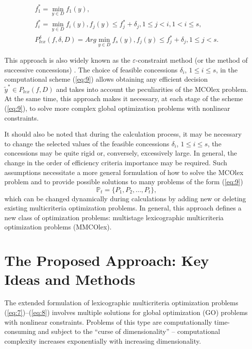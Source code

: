 \documentclass[smallextended]{svjour3}       %
\begin{document}
\begin{equation}\label{eq:9}
\begin{matrix}
f^*_1 =\min_{y \in D}{f_1(y)},  \\
f^*_i =\min_{y \in D}{f_i(y)},  f_j(y) \leq f^*_j + \delta_j, 1 \leq j < i, 1 < i \leq s, \\
P_{lex}^\delta(f,\delta,D) = Arg \min_{y \in D}{f_s(y)},f_j(y) \leq f^*_j + \delta_j, 1 \leq j < s.
\end{matrix}
\end{equation}

This approach is also widely known as the $\varepsilon$-constraint method (or the method of successive concessions) \cite{c39,c40,c41,c42}. The choice of feasible concessions $\delta_i$, $1 \leq i \leq s$, in the computational scheme (\ref{eq:9}) allows obtaining any efficient decision $\widetilde{y}^* \in P_{lex}(f,D)$ and takes into account the peculiarities of the MCOlex problem. At the same time, this approach makes it necessary, at each stage of the scheme (\ref{eq:9}), to solve more complex global optimization problems with nonlinear constraints.

It should also be noted that during the calculation process, it may be necessary to change the selected values of the feasible concessions $\delta_i$, $1 \leq i \leq s$, the concessions may be quite rigid or, conversely, excessively large. In general, the change in the order of efficiency criteria importance may be required. Such assumptions necessitate a more general formulation of how to solve the MCOlex problem and to provide possible solutions to many problems of the form (\ref{eq:9})
\begin{equation}\label{eq:10}
\mathbb{P}_t=\{ P_1,P_2,\dots,P_t\},
\end{equation}
which can be changed dynamically during calculations by adding new or deleting existing multicriteria optimization problems. In general, this approach defines a new class of optimization problems: multistage lexicographic multicriteria optimization problems (MMCOlex).

\section{The Proposed Approach: Key Ideas and Methods}
\label{sec:3}

The extended formulation of lexicographic multicriteria optimization problems (\ref{eq:7})--(\ref{eq:8}) involves multiple solutions for global optimization (GO) problems with nonlinear constraints. Problems of this type are computationally time-consuming and subject to the ``curse of dimensionality'' -- computational complexity increases exponentially with increasing dimensionality.
\end{document}
